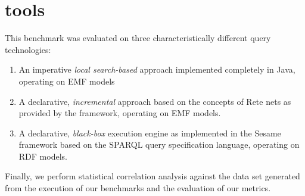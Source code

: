 \section{tools}

This benchmark was evaluated on three characteristically different query
technologies:
\begin{enumerate}
  \item An imperative \emph{local search-based} approach implemented completely in Java, operating on EMF models
  \item A declarative, \emph{incremental} approach based on the concepts of Rete nets as provided by the \incquery{} framework, operating on EMF models.
  \item A declarative, \emph{black-box} execution engine as implemented in the
  Sesame framework based on the SPARQL query specification language, operating on RDF models.
\end{enumerate}

Finally, we perform statistical correlation analysis against the
data set generated from the execution of our benchmarks and the evaluation of our
metrics.  


